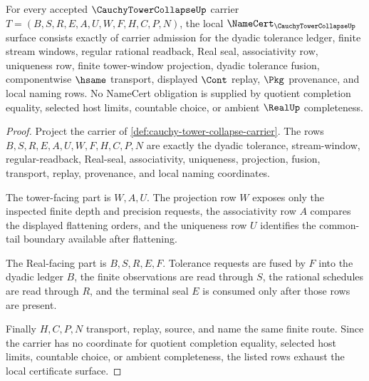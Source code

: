 \begin{theorem}
\label{thm:cauchy-tower-collapse-namecert-obligations}
For every accepted $\CauchyTowerCollapseUp$ carrier $T=(B,S,R,E,A,U,W,F,H,C,P,N)$, the local $\NameCert_{\CauchyTowerCollapseUp}$ surface consists exactly of carrier admission for the dyadic tolerance ledger, finite stream windows, regular rational readback, Real seal, associativity row, uniqueness row, finite tower-window projection, dyadic tolerance fusion, componentwise $\hsame$ transport, displayed $\Cont$ replay, $\Pkg$ provenance, and local naming rows. No NameCert obligation is supplied by quotient completion equality, selected host limits, countable choice, or ambient $\RealUp$ completeness.
\end{theorem}
\begin{proof}
Project the carrier of \autoref{def:cauchy-tower-collapse-carrier}. The rows $B,S,R,E,A,U,W,F,H,C,P,N$ are exactly the dyadic tolerance, stream-window, regular-readback, Real-seal, associativity, uniqueness, projection, fusion, transport, replay, provenance, and local naming coordinates.

The tower-facing part is $W,A,U$. The projection row $W$ exposes only the inspected finite depth and precision requests, the associativity row $A$ compares the displayed flattening orders, and the uniqueness row $U$ identifies the common-tail boundary available after flattening.

The Real-facing part is $B,S,R,E,F$. Tolerance requests are fused by $F$ into the dyadic ledger $B$, the finite observations are read through $S$, the rational schedules are read through $R$, and the terminal seal $E$ is consumed only after those rows are present.

Finally $H,C,P,N$ transport, replay, source, and name the same finite route. Since the carrier has no coordinate for quotient completion equality, selected host limits, countable choice, or ambient completeness, the listed rows exhaust the local certificate surface.
\end{proof}

